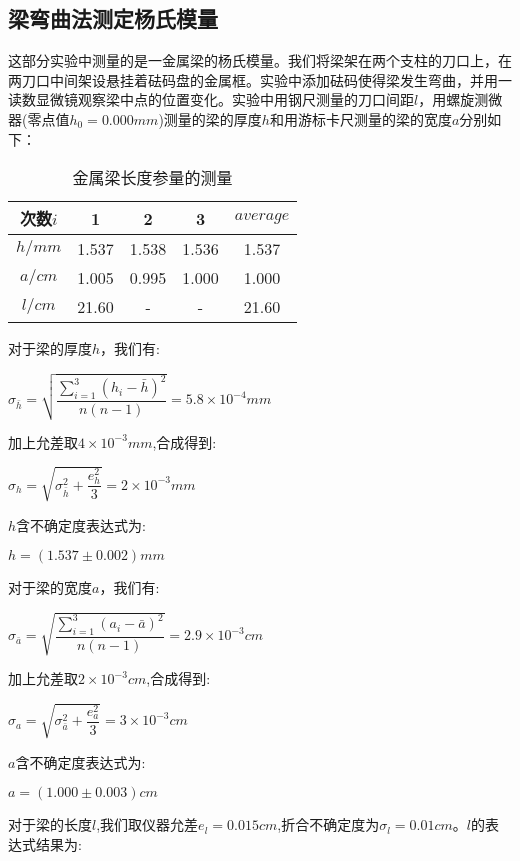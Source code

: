 \documentclass[a4 paper,12pt]{article}
\begin{document}
\subsection{梁弯曲法测定杨氏模量}
这部分实验中测量的是一金属梁的杨氏模量。我们将梁架在两个支柱的刀口上，在两刀口中间架设悬挂着砝码盘的金属框。实验中添加砝码使得梁发生弯曲，并用一读数显微镜观察梁中点的位置变化。实验中用钢尺测量的刀口间距$l$，用螺旋测微器(零点值$h_{0}=0.000mm$)测量的梁的厚度$h$和用游标卡尺测量的梁的宽度$a$分别如下：
\begin{table}[H]
	\caption{金属梁长度参量的测量}
	\label{金属梁长度参量的测量}
	\centering
	\begin{tabular}{*{5}{c}}
		\toprule[0.5mm]
		次数$i$&1&2&3&$average$\\
		\midrule
		$h/mm$&1.537&1.538&1.536&1.537\\
		$a/cm$&1.005&0.995&1.000&1.000\\
		$l/cm$&21.60&-&-&21.60\\
		\bottomrule[0.5mm]
	\end{tabular}
\end{table}
对于梁的厚度$h$，我们有:
\begin{center}
	$\sigma_{\bar{h}}=\sqrt{\dfrac{\sum\limits_{i=1}^{3}(h_{i}-\bar{h})^{2}}{n(n-1)}}=5.8\times10^{-4}mm$
\end{center}
\par 加上允差取$4\times10^{-3}mm$,合成得到:
\begin{center}
	$\sigma_{h}=\sqrt{\sigma_{\bar{h}}^{2}+\dfrac{e_{h}^{2}}{3}}=2\times10^{-3}mm$
\end{center}
\par $h$含不确定度表达式为:
\begin{center}
	$h=(1.537\pm0.002)mm$
\end{center}
\par 对于梁的宽度$a$，我们有:
\begin{center}
	$\sigma_{\bar{a}}=\sqrt{\dfrac{\sum\limits_{i=1}^{3}(a_{i}-\bar{a})^{2}}{n(n-1)}}=2.9\times10^{-3}cm$
\end{center}
\par 加上允差取$2\times10^{-3}cm$,合成得到:
\begin{center}
	$\sigma_{a}=\sqrt{\sigma_{\bar{a}}^{2}+\dfrac{e_{a}^{2}}{3}}=3\times10^{-3}cm$
\end{center}
\par $a$含不确定度表达式为:
\begin{center}
	$a=(1.000\pm0.003)cm$
\end{center}
\par 对于梁的长度$l$,我们取仪器允差$e_{l}=0.015cm$,折合不确定度为$\sigma_{l}=0.01cm$。$l$的表达式结果为:
\end{document}
